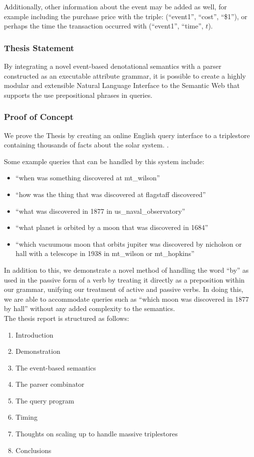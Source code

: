 \documentclass[../main.tex]{subfiles}
\begin{document}
Additionally, other information about the event may be added as well, for example including the purchase price with the triple: (``event1'', ``cost'', ``\$1''), or perhaps the time the transaction occurred with (``event1'', ``time'', $t$).  

\subsubsection*{Thesis Statement}
By integrating a novel event-based denotational semantics with a parser constructed as an executable attribute grammar, it is possible to create a highly modular and extensible Natural Language Interface to the Semantic Web that supports the use prepositional phrases in queries.

\subsubsection*{Proof of Concept} We prove the Thesis by creating an online English query interface to a triplestore containing thousands of facts about the solar system. \cite{Solarman:2016}.

Some example queries that can be handled by this system include:

\begin{itemize}
	\item ``when was something discovered at mt\_wilson''
	\item ``how was the thing that was discovered at flagstaff discovered''
	\item ``what was discovered in 1877 in us\_naval\_observatory''
	\item ``what planet is orbited by a moon that was discovered in 1684''
	\item ``which vacuumous moon that orbits jupiter was discovered by nicholson or hall with a telescope in 1938 in mt\_wilson or mt\_hopkins''
\end{itemize}

In addition to this, we demonstrate a novel method of handling the word ``by'' as used in the passive form of a verb by treating it directly as a preposition within our grammar, unifying our treatment of active and passive verbs.  In doing this, we are able to accommodate queries such as ``which moon was discovered in 1877 by hall'' without any added complexity to the semantics.\\

The thesis report is structured as follows:

\begin{enumerate}
	\item Introduction
	\item Demonstration
	\item The event-based semantics
	\item The parser combinator
	\item The query program
	\item Timing
	\item Thoughts on scaling up to handle massive triplestores
	\item Conclusions
\end{enumerate}
\end{document}
